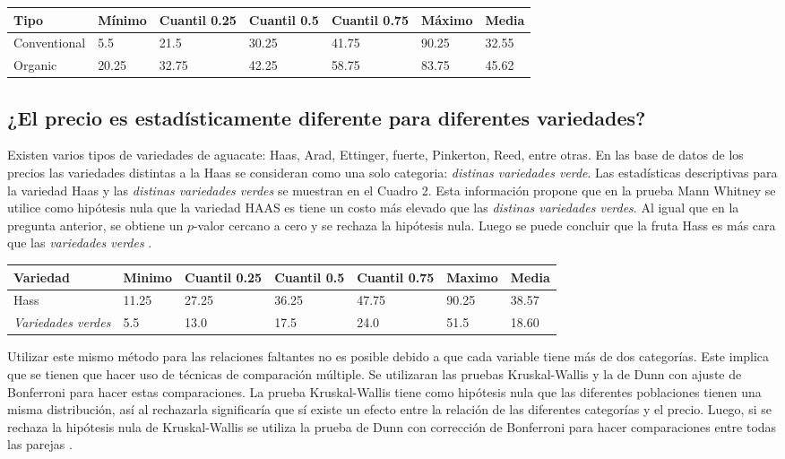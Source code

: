 \documentclass{article}
\begin{document}
\begin{center}
\begin{tabular}{|l|l|l|l|l|l|l|}
	\hline
		Tipo & Mínimo & Cuantil 0.25 & Cuantil 0.5 & Cuantil 0.75 & Máximo & Media \\ \hline
		Conventional & 5.5 & 21.5 & 30.25 & 41.75 & 90.25 & 32.55\\ \hline
 		Organic & 20.25 & 32.75 & 42.25 & 58.75 & 83.75 & 45.62\\ \hline
	\end{tabular}
\end{center}
\subsection*{¿El precio  es estadísticamente diferente para diferentes variedades?}
Existen varios tipos de variedades de aguacate: Haas, Arad, Ettinger, fuerte, Pinkerton, Reed, entre otras. En las base de datos de los precios las variedades distintas a la Haas se consideran como una solo categoria: \textit{distinas variedades verde}. Las estadísticas descriptivas para la variedad Haas y las \textit{distinas variedades verdes} se muestran en el Cuadro 2. Esta información propone que en la prueba Mann Whitney se utilice como hipótesis nula que la variedad HAAS es tiene un costo más elevado que las \textit{distinas variedades verdes}. Al igual que en la pregunta anterior, se obtiene un $p$-valor cercano a cero y se rechaza la hipótesis nula. Luego se puede concluir que la fruta Hass es más cara que las \textit{variedades verdes} .

\begin{center}
\begin{tabular}{|l|l|l|l|l|l|l|}
	\hline
		Variedad & Minimo & Cuantil 0.25 & Cuantil 0.5 & Cuantil 0.75 & Maximo & Media \\ \hline
	Hass & 11.25 & 27.25 & 36.25 & 47.75 & 90.25 & 38.57\\ \hline
 \textit{Variedades verdes} & 5.5 & 13.0 & 17.5 & 24.0 & 51.5 & 18.60\\ \hline
	\end{tabular}
\end{center}

Utilizar este mismo método para las relaciones faltantes no es posible debido a que cada variable tiene más de dos categorías. Este implica que se tienen que hacer uso de técnicas de comparación múltiple. Se utilizaran las pruebas Kruskal-Wallis y la de Dunn con ajuste de Bonferroni para hacer estas comparaciones. La prueba Kruskal-Wallis tiene como hipótesis nula que las diferentes poblaciones tienen una misma distribución, así al rechazarla significaría que sí existe un efecto entre la relación de las diferentes categorías y el precio. Luego, si se rechaza la hipótesis nula de Kruskal-Wallis se utiliza la prueba de Dunn con corrección de Bonferroni para hacer comparaciones entre todas las parejas . 
\end{document}
